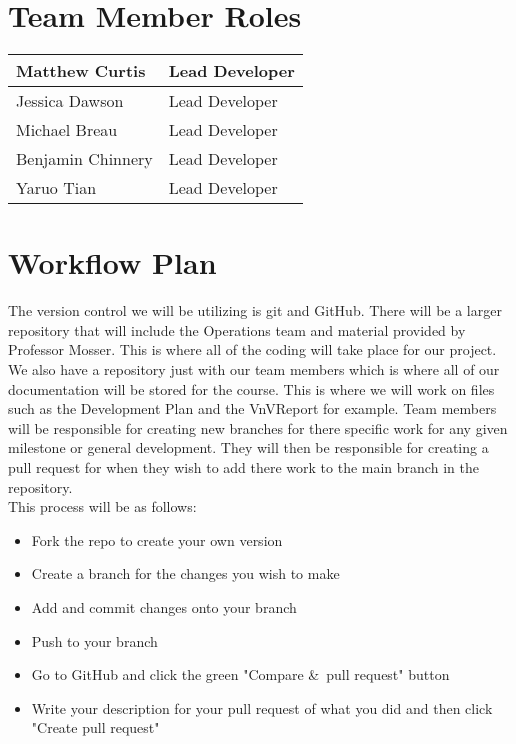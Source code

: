\documentclass{article}
\begin{document}
\section{Team Member Roles}
\begin{center}
\begin{tabular}{ | m{3cm}| m{7cm} | } 
  \hline
  Matthew Curtis & Lead Developer \\ 
  \hline
  Jessica Dawson & Lead Developer \\ 
  \hline
  Michael Breau & Lead Developer \\ 
 \hline
  Benjamin Chinnery & Lead Developer \\ 
 \hline
  Yaruo Tian & Lead Developer \\ 
  \hline
\end{tabular}
\end{center}
\section{Workflow Plan}

The version control we will be utilizing is git and GitHub. There will be a larger repository that will include the Operations team and material provided by Professor Mosser. This is where all of the coding will take place for our project. We also have a repository just with our team members which is where all of our documentation will be stored for the course. This is where we will work on files such as the Development Plan and the VnVReport for example. Team members will be responsible for creating new branches for there specific work for any given milestone or general development. They will then be responsible for creating a pull request for when they wish to add there work to the main branch in the repository. \\

This process will be as follows:
\begin{itemize}
  \item Fork the repo to create your own version
  \item Create a branch for the changes you wish to make
    \item Add and commit changes onto your branch
  \item Push to your branch
\item Go to GitHub and click the green "Compare \&\ pull request" button
  \item Write your description for your pull request of what you did and then click "Create pull request"
\end{itemize}
\end{document}
